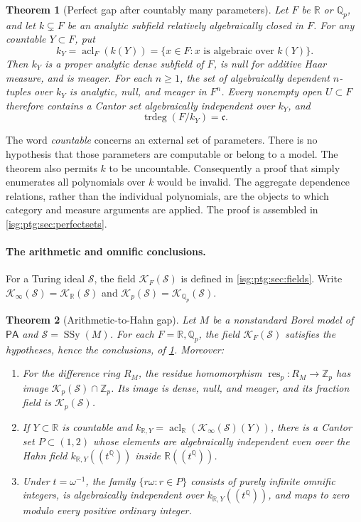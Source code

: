 \documentclass[11pt]{article}
\newtheorem{theorem}{Theorem}[section]
\theoremstyle{definition}
\theoremstyle{remark}
\newcommand{\R}{\mathbb{R}}
\newcommand{\Q}{\mathbb{Q}}
\newcommand{\res}{\operatorname{res}}
\newcommand{\Qp}{\mathbb{Q}_p}
\newcommand{\Zp}{\mathbb{Z}_p}
\newcommand{\PA}{\mathsf{PA}}
\newcommand{\SSy}{\operatorname{SSy}}
\newcommand{\acl}{\operatorname{acl}}
\newcommand{\trdeg}{\operatorname{trdeg}}
\newcommand{\cfrak}{\mathfrak{c}}
\begin{document}
\begin{theorem}[Perfect gap after countably many parameters]\label{isg:ptg:thm:headline}
Let $F$ be $\R$ or $\Qp$, and let $k\subsetneq F$ be an analytic subfield
relatively algebraically closed in $F$. For any countable $Y\subset F$, put
\[
 k_Y=\acl_F(k(Y))
 =\{x\in F:x\text{ is algebraic over }k(Y)\}.
\]
Then $k_Y$ is a proper analytic dense subfield of $F$, is null for additive
Haar measure, and is meager. For each $n\geq1$, the set of algebraically
dependent $n$-tuples over $k_Y$ is analytic, null, and meager in $F^n$.
Every nonempty open $U\subset F$ therefore contains a Cantor set
algebraically independent over $k_Y$, and
\[
 \trdeg(F/k_Y)=\cfrak.
\]
\end{theorem}

The word \emph{countable} concerns an external set of parameters. There is
no hypothesis that those parameters are computable or belong to a model.
The theorem also permits $k$ to be uncountable. Consequently a proof that
simply enumerates all polynomials over $k$ would be invalid. The aggregate
dependence relations, rather than the individual polynomials, are the
objects to which category and measure arguments are applied. The proof is
assembled in \cref{isg:ptg:sec:perfectsets}.

\paragraph{The arithmetic and omnific conclusions.} For a Turing ideal
$\mathcal S$, the field $\mathcal K_F(\mathcal S)$ is defined in
\cref{isg:ptg:sec:fields}. Write $\mathcal K_\infty(\mathcal S)=\mathcal K_\R(\mathcal S)$
and $\mathcal K_p(\mathcal S)=\mathcal K_{\Qp}(\mathcal S)$.

\begin{theorem}[Arithmetic-to-Hahn gap]\label{isg:ptg:thm:arithmetic}
Let $M$ be a nonstandard Borel model of $\PA$ and $\mathcal S=\SSy(M)$.
For each $F=\R,\Qp$, the field $\mathcal K_F(\mathcal S)$ satisfies the
hypotheses, hence the conclusions, of \cref{isg:ptg:thm:headline}.
Moreover:
\begin{enumerate}[label=\textup{(\arabic*)}]
\item For the difference ring $R_M$, the residue homomorphism
$\res_p:R_M\to\Zp$ has image $\mathcal K_p(\mathcal S)\cap\Zp$. Its image
is dense, null, and meager, and its fraction field is
$\mathcal K_p(\mathcal S)$.
\item If $Y\subset\R$ is countable and
$k_{\R,Y}=\acl_\R(\mathcal K_\infty(\mathcal S)(Y))$, there is a Cantor set
$P\subset(1,2)$ whose elements are algebraically independent even over the
Hahn field $k_{\R,Y}((t^\Q))$ inside $\R((t^\Q))$.
\item Under $t=\omega^{-1}$, the family $\{r\omega:r\in P\}$ consists of
purely infinite omnific integers, is algebraically independent over
$k_{\R,Y}((t^\Q))$, and maps to zero modulo every positive ordinary
integer.
\end{enumerate}
\end{theorem}
\end{document}
